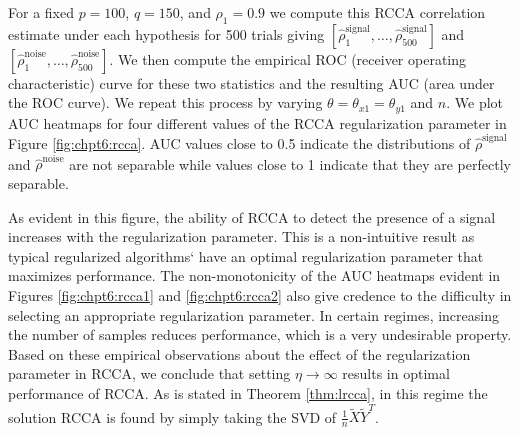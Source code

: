 For a fixed $p=100$, $q=150$, and $\rho_1=0.9$ we compute this RCCA correlation estimate
under each hypothesis for 500 trials giving
$\left[\widehat{\rho}_1^{\text{signal}},\dots,\widehat{\rho}_{500}^{\text{signal}}\right]$
and
$\left[\widehat{\rho}_1^{\text{noise}},\dots,\widehat{\rho}_{500}^{\text{noise}}\right]$. We
then compute the empirical ROC (receiver operating characteristic) curve for these two
statistics and the resulting AUC (area under the ROC curve). We repeat this process by
varying $\theta=\theta_{x1}=\theta_{y1}$ and $n$. We plot AUC heatmaps for four different
values of the RCCA regularization parameter in Figure \ref{fig:chpt6:rcca}. AUC values close to
0.5 indicate the distributions of $\widehat{\rho}^{\text{signal}}$ and
$\widehat{\rho}^{\text{noise}}$ are not separable while values close to 1 indicate that
they are perfectly separable. 

As evident in this figure, the ability of RCCA to detect the presence of a signal increases
with the regularization parameter. This is a non-intuitive result as typical regularized
algorithms` have an optimal regularization parameter that maximizes performance. The
non-monotonicity of the AUC heatmaps evident in Figures \ref{fig:chpt6:rcca1} and
\ref{fig:chpt6:rcca2} also give credence to the difficulty in selecting an appropriate
regularization parameter. In certain regimes, increasing the number of samples reduces
performance, which is a very undesirable property. Based on these empirical observations
about the effect of the regularization parameter in RCCA, we conclude that setting
$\eta\to\infty$ results in optimal performance of RCCA. As is stated in Theorem
\ref{thm:lrcca}, in this regime the solution RCCA is found by simply taking the SVD of
$\frac{1}{n}\widetilde{X}\widetilde{Y}^T$. 

